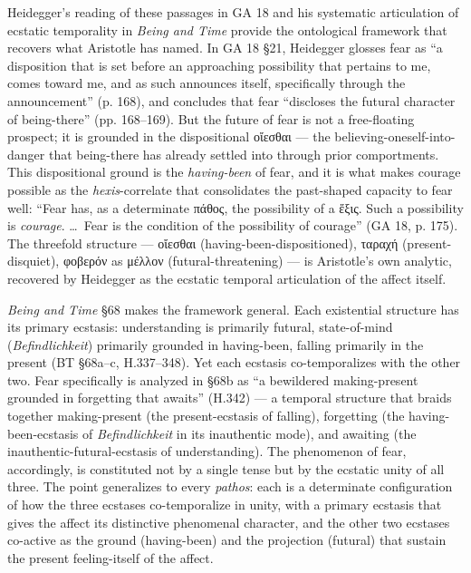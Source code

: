 \documentclass{article}
\newcommand{\gk}[1]{{\greekfont #1}}
\begin{document}
Heidegger's reading of these passages in GA 18 and his systematic articulation of ecstatic temporality in \textit{Being and Time} provide the ontological framework that recovers what Aristotle has named. In GA 18 \S21, Heidegger glosses fear as ``a disposition that is set before an approaching possibility that pertains to me, comes toward me, and as such announces itself, specifically through the announcement'' (p. 168), and concludes that fear ``discloses the futural character of being-there'' (pp. 168--169). But the future of fear is not a free-floating prospect; it is grounded in the dispositional \gk{οἴεσθαι} --- the believing-oneself-into-danger that being-there has already settled into through prior comportments. This dispositional ground is the \textit{having-been} of fear, and it is what makes courage possible as the \textit{hexis}-correlate that consolidates the past-shaped capacity to fear well: ``Fear has, as a determinate \gk{πάθος}, the possibility of a \gk{ἕξις}. Such a possibility is \textit{courage}. \ldots\ Fear is the condition of the possibility of courage'' (GA 18, p. 175). The threefold structure --- \gk{οἴεσθαι} (having-been-dispositioned), \gk{ταραχή} (present-disquiet), \gk{φοβερόν} as \gk{μέλλον} (futural-threatening) --- is Aristotle's own analytic, recovered by Heidegger as the ecstatic temporal articulation of the affect itself.

\textit{Being and Time} \S68 makes the framework general. Each existential structure has its primary ecstasis: understanding is primarily futural, state-of-mind (\textit{Befindlichkeit}) primarily grounded in having-been, falling primarily in the present (BT \S68a--c, H.337--348). Yet each ecstasis co-temporalizes with the other two. Fear specifically is analyzed in \S68b as ``a bewildered making-present grounded in forgetting that awaits'' (H.342) --- a temporal structure that braids together making-present (the present-ecstasis of falling), forgetting (the having-been-ecstasis of \textit{Befindlichkeit} in its inauthentic mode), and awaiting (the inauthentic-futural-ecstasis of understanding). The phenomenon of fear, accordingly, is constituted not by a single tense but by the ecstatic unity of all three. The point generalizes to every \textit{pathos}: each is a determinate configuration of how the three ecstases co-temporalize in unity, with a primary ecstasis that gives the affect its distinctive phenomenal character, and the other two ecstases co-active as the ground (having-been) and the projection (futural) that sustain the present feeling-itself of the affect.
\end{document}
